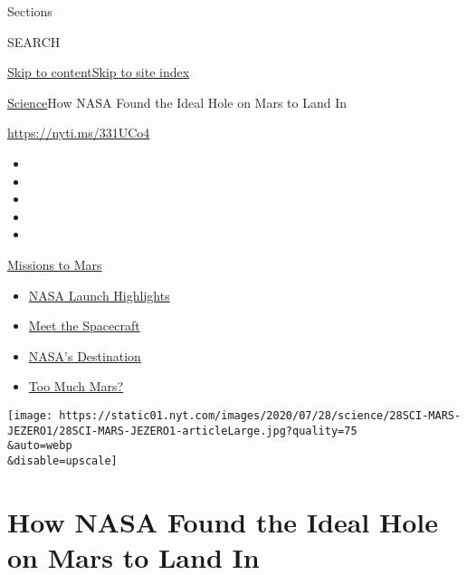 Sections

SEARCH

\protect\hyperlink{site-content}{Skip to
content}\protect\hyperlink{site-index}{Skip to site index}

\href{/section/science}{Science}\textbar{}How NASA Found the Ideal Hole
on Mars to Land In

\url{https://nyti.ms/331UCo4}

\begin{itemize}
\item
\item
\item
\item
\item
\end{itemize}

\href{https://www.nytimes.com/news-event/summer-of-mars?action=click\&pgtype=Article\&state=default\&region=TOP_BANNER\&context=storylines_menu}{Missions
to Mars}

\begin{itemize}
\tightlist
\item
  \href{https://www.nytimes.com/2020/07/30/science/nasa-mars-launch.html?action=click\&pgtype=Article\&state=default\&region=TOP_BANNER\&context=storylines_menu}{NASA
  Launch Highlights}
\item
  \href{https://www.nytimes.com/interactive/2020/science/mars-perseverance-tianwen-hope.html?action=click\&pgtype=Article\&state=default\&region=TOP_BANNER\&context=storylines_menu}{Meet
  the Spacecraft}
\item
  \href{https://www.nytimes.com/2020/07/28/science/nasa-jezero-perseverance.html?action=click\&pgtype=Article\&state=default\&region=TOP_BANNER\&context=storylines_menu}{NASA's
  Destination}
\item
  \href{https://www.nytimes.com/2020/07/28/science/mars-nasa-science.html?action=click\&pgtype=Article\&state=default\&region=TOP_BANNER\&context=storylines_menu}{Too
  Much Mars?}
\end{itemize}

\texttt{[image: https://static01.nyt.com/images/2020/07/28/science/28SCI-MARS-JEZERO1/28SCI-MARS-JEZERO1-articleLarge.jpg?quality=75\\\&auto=webp\\\&disable=upscale]}

\hypertarget{how-nasa-found-the-ideal-hole-on-mars-to-land-in}{%
\section{How NASA Found the Ideal Hole on Mars to Land
In}\label{how-nasa-found-the-ideal-hole-on-mars-to-land-in}}

